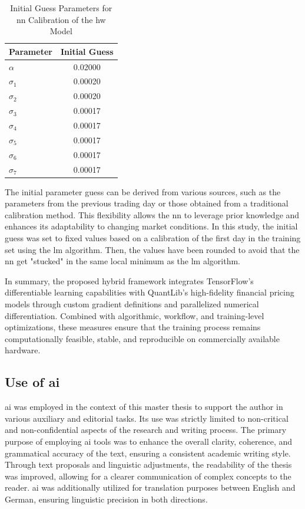 \begin{table}[H]
	\centering
	\begin{threeparttable}
		\caption{Initial Guess Parameters for \ac{nn} Calibration of the \ac{hw} Model}
		\label{tab:hw_initial_guess}
		\begin{tabular}{l c}
			\hline
			Parameter  & Initial Guess \\
			\hline
			$\alpha$   & 0.02000       \\
			$\sigma_1$ & 0.00020       \\
			$\sigma_2$ & 0.00020       \\
			$\sigma_3$ & 0.00017       \\
			$\sigma_4$ & 0.00017       \\
			$\sigma_5$ & 0.00017       \\
			$\sigma_6$ & 0.00017       \\
			$\sigma_7$ & 0.00017       \\
			\hline
		\end{tabular}
	\end{threeparttable}
\end{table}

The initial parameter guess can be derived from various sources, such as the parameters from the previous trading day or those obtained from a traditional calibration method. This flexibility allows the \ac{nn} to leverage prior knowledge and enhances its adaptability to changing market conditions. In this study, the initial guess was set to fixed values based on a calibration of the first day in the training set using the \ac{lm} algorithm. Then, the values have been rounded to avoid that the \ac{nn} get "stucked" in the same local minimum as the \ac{lm} algorithm.

In summary, the proposed hybrid framework integrates TensorFlow's differentiable learning capabilities with QuantLib's high-fidelity financial pricing models through custom gradient definitions and parallelized numerical differentiation. Combined with algorithmic, workflow, and training-level optimizations, these measures ensure that the training process remains computationally feasible, stable, and reproducible on commercially available hardware.

\subsection{Use of \ac{ai}}
\ac{ai} was employed in the context of this master thesis to support the author in various auxiliary and editorial tasks. Its use was strictly limited to non-critical and non-confidential aspects of the research and writing process. The primary purpose of employing \ac{ai} tools was to enhance the overall clarity, coherence, and grammatical accuracy of the text, ensuring a consistent academic writing style. Through text proposals and linguistic adjustments, the readability of the thesis was improved, allowing for a clearer communication of complex concepts to the reader. \ac{ai} was additionally utilized for translation purposes between English and German, ensuring linguistic precision in both directions.

